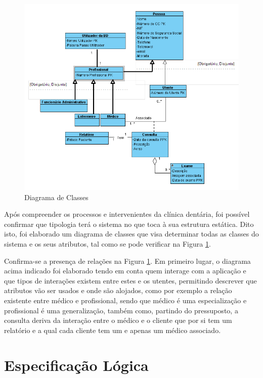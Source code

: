 \documentclass[11pt,a4paper,twoside]{report}
\begin{document}
\begin{figure}[H]
	\centering
	\includegraphics[width=0.95\linewidth]{image/DiagramaCLasses}
	\caption [Diagrama de Classes] {Diagrama de Classes}
	\label{fig:diagramaclasses}
\end{figure}

Após compreender os processos e intervenientes da clínica dentária, foi possível confirmar que tipologia terá o sistema no que toca à sua estrutura estática. Dito isto, foi elaborado um diagrama de classes que visa determinar todas as classes do sistema e os seus atributos, tal como se pode verificar na Figura \ref{fig:diagramaclasses}. 

Confirma-se a presença de relações na Figura \ref{fig:diagramaclasses}. Em primeiro lugar, o diagrama acima indicado foi elaborado tendo em conta quem interage com a aplicação e que tipos de interações existem entre estes e os utentes, permitindo descrever que atributos vão ser usados e onde são alojados, como por exemplo a relação existente entre médico e profissional, sendo que médico é uma especialização e profissional é uma generalização, também como, partindo do pressuposto, a consulta deriva da interação entre o médico e o cliente que por si tem um relatório e a qual cada cliente tem um e apenas um médico associado. 


\chapter{Especificação Lógica}
\end{document}
